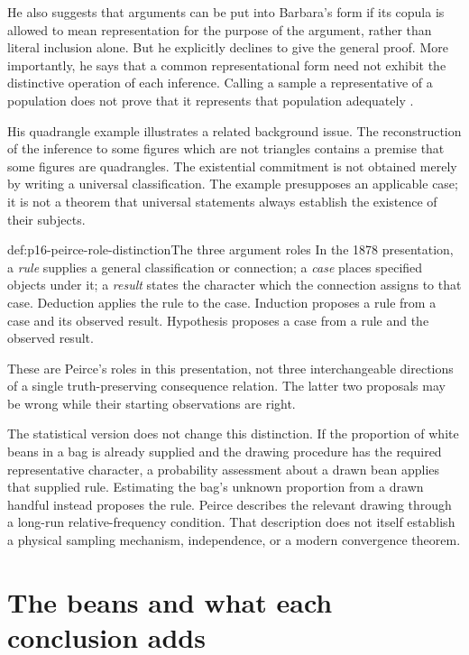 He also suggests that arguments can be put into Barbara's form if its
copula is allowed to mean representation for the purpose of the argument,
rather than literal inclusion alone. But he explicitly declines to give
the general proof. More importantly, he says that a common representational
form need not exhibit the distinctive operation of each inference. Calling
a sample a representative of a population does not prove that it represents
that population adequately \parencite[sec.~I]{Peirce1878DIHPrimary}.

His quadrangle example illustrates a related background issue. The
reconstruction of the inference to some figures which are not triangles
contains a premise that some figures are quadrangles. The existential
commitment is not obtained merely by writing a universal classification.
The example presupposes an applicable case; it is not a theorem that
universal statements always establish the existence of their subjects.

\begin{hbdefinition}{def:p16-peirce-role-distinction}{The three argument roles}
In the 1878 presentation, a \emph{rule} supplies a general classification
or connection; a \emph{case} places specified objects under it; a
\emph{result} states the character which the connection assigns to that
case. Deduction applies the rule to the case. Induction proposes a rule
from a case and its observed result. Hypothesis proposes a case from a
rule and the observed result.

These are Peirce's roles in this presentation, not three interchangeable
directions of a single truth-preserving consequence relation. The latter
two proposals may be wrong while their starting observations are right.
\end{hbdefinition}

The statistical version does not change this distinction. If the
proportion of white beans in a bag is already supplied and the drawing
procedure has the required representative character, a probability
assessment about a drawn bean applies that supplied rule. Estimating the
bag's unknown proportion from a drawn handful instead proposes the rule.
Peirce describes the relevant drawing through a long-run relative-frequency
condition. That description does not itself establish a physical sampling
mechanism, independence, or a modern convergence theorem.

\section{The beans and what each conclusion adds}
\label{sec:p16-peirce-beans}

